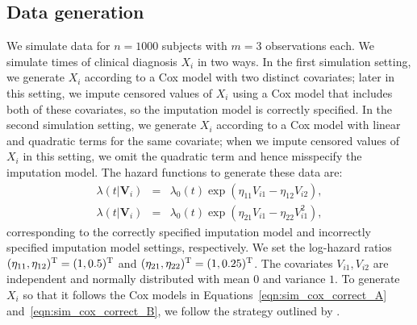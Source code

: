 \documentclass[12pt]{article}
\def\log{\hbox{log}}
\def\be{\begin{eqnarray}}
\def\ee{\end{eqnarray}}
\def\trans{^{\rm T}}
\def\bV{{\boldsymbol V}}
\begin{document}
\subsection{Data generation}
\label{sec:sim-setup}
We simulate data for $n=1000$ subjects with $m=3$ observations each. We simulate times of clinical diagnosis $X_i$ in two ways. In the first simulation setting, we generate $X_i$ according to a Cox model with two distinct covariates; later in this setting, we impute censored values of $X_i$ using a Cox model that includes both of these covariates, so the imputation model is correctly specified. In the second simulation setting, we generate $X_i$ according to a Cox model with linear and quadratic terms for the same covariate; when we impute censored values of $X_i$ in this setting, we omit the quadratic term and hence misspecify the imputation model. The hazard functions to generate these data are:
\be
\lambda(t|\bV_i)&=&\lambda_0(t)\exp(\eta_{11}V_{i1}-\eta_{12}V_{i2})\label{eqn:sim_cox_correct_A},%
\\
\lambda(t|\bV_i)&=&\lambda_0(t)\exp(\eta_{21}V_{i1}-\eta_{22} V_{i1}^2)\label{eqn:sim_cox_correct_B},
\ee
corresponding to the correctly specified imputation model and incorrectly specified imputation model settings, respectively. We set the log-hazard ratios $(\eta_{11},\eta_{12})\trans=(1,0.5)\trans$ and $(\eta_{21},\eta_{22})\trans=(1,0.25)\trans$. The covariates $V_{i1}, V_{i2}$ are independent and normally distributed with mean $0$ and variance $1$. To generate $X_i$ so that it follows the Cox models in Equations~\eqref{eqn:sim_cox_correct_A} and~\eqref{eqn:sim_cox_correct_B}, we follow the strategy outlined by \cite{bender2005generating}.%
\end{document}
